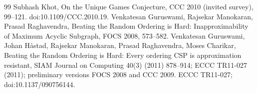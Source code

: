 \documentclass[11pt]{article}
\begin{document}
\begin{thebibliography}{99}
 Subhash Khot, On the Unique Games Conjecture, CCC 2010 (invited survey), 99--121. doi:10.1109/CCC.2010.19.
 Venkatesan Guruswami, Rajsekar Manokaran, Prasad Raghavendra, Beating the Random Ordering is Hard: Inapproximability of Maximum Acyclic Subgraph, FOCS 2008, 573--582.
 Venkatesan Guruswami, Johan Håstad, Rajsekar Manokaran, Prasad Raghavendra, Moses Charikar, Beating the Random Ordering is Hard: Every ordering CSP is approximation resistant, SIAM Journal on Computing 40(3) (2011) 878--914; ECCC TR11-027 (2011); preliminary versions FOCS 2008 and CCC 2009. ECCC TR11-027; doi:10.1137/090756144.
\end{thebibliography}
\space%
\end{document}
